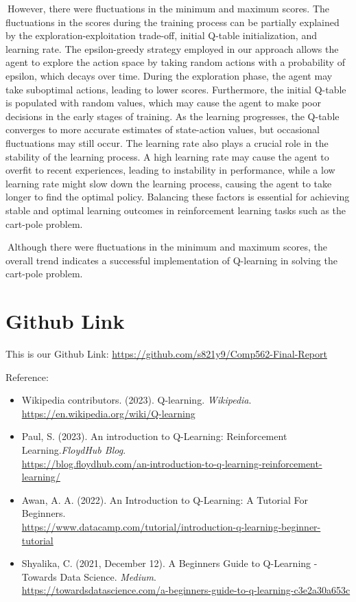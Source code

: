 \documentclass{article}
\begin{document}
$\>$However, there were fluctuations in the minimum and maximum scores. The fluctuations in the scores during the training process can be partially explained by the exploration-exploitation trade-off, initial Q-table initialization, and learning rate. The epsilon-greedy strategy employed in our approach allows the agent to explore the action space by taking random actions with a probability of epsilon, which decays over time. During the exploration phase, the agent may take suboptimal actions, leading to lower scores. Furthermore, the initial Q-table is populated with random values, which may cause the agent to make poor decisions in the early stages of training. As the learning progresses, the Q-table converges to more accurate estimates of state-action values, but occasional fluctuations may still occur. The learning rate also plays a crucial role in the stability of the learning process. A high learning rate may cause the agent to overfit to recent experiences, leading to instability in performance, while a low learning rate might slow down the learning process, causing the agent to take longer to find the optimal policy. Balancing these factors is essential for achieving stable and optimal learning outcomes in reinforcement learning tasks such as the cart-pole problem. 

$\>$Although there were fluctuations in the minimum and maximum scores,  the overall trend indicates a successful implementation of Q-learning in solving the cart-pole problem.

\section{Github Link}
 
 This is our Github Link: \quad \url{https://github.com/s821y9/Comp562-Final-Report}

 
 
 
 
 
 \newpage
 Reference:
\begin{itemize}
\item Wikipedia contributors. (2023). Q-learning. \emph{Wikipedia}.\\
 \url{https://en.wikipedia.org/wiki/Q-learning}
\item Paul, S. (2023). An introduction to Q-Learning: Reinforcement Learning.\emph{FloydHub Blog}. \\
\url{https://blog.floydhub.com/an-introduction-to-q-learning-reinforcement-learning/}
\item Awan, A. A. (2022). An Introduction to Q-Learning: A Tutorial For Beginners. \\
\url{https://www.datacamp.com/tutorial/introduction-q-learning-beginner-tutorial}
\item Shyalika, C. (2021, December 12). A Beginners Guide to Q-Learning - Towards Data Science. \emph{Medium}. \\
\url{https://towardsdatascience.com/a-beginners-guide-to-q-learning-c3e2a30a653c}
\end{itemize}
 
 
 
 
 
 
 
 
\end{document}
